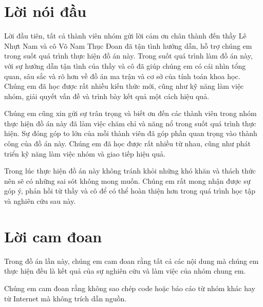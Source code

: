 \documentclass[a4paper]{article}
\renewcommand{\figurename}{Hình}
\begin{document}
\clearpage
\pagestyle{fancy}
\renewcommand{\contentsname}{Mục lục}
\renewcommand{\tablename}{Bảng}
\renewcommand{\figurename}{Hình}
\renewcommand{\refname}{Tài liệu tham khảo}

\tableofcontents
\thispagestyle{fancy}

\newpage

\renewcommand{\arraystretch}{1.3} %


\section*{Lời nói đầu}

Lời đầu tiên, tất cả thành viên nhóm gửi lời cảm ơn chân thành đến thầy Lê Nhựt Nam và cô Võ Nam Thục Đoan đã tận tình hướng dẫn, hỗ trợ chúng em trong suốt quá trình thực hiện đồ án này. Trong suốt quá trình làm đồ án này, với sự hướng dẫn tận tình của thầy và cô đã giúp chúng em có cái nhìn tổng quan, sâu sắc và rõ hơn về đồ án ma trận và cơ sở của tính toán khoa học. Chúng em đã học được rất nhiều kiến thức mới, cũng như kỹ năng làm việc nhóm, giải quyết vấn đề và trình bày kết quả một cách hiệu quả.

Chúng em cũng xin gửi sự trân trọng và biết ơn đến các thành viên trong nhóm thực hiện đồ án này đã làm việc chăm chỉ và năng nổ trong suốt quá trình thực hiện. Sự đóng góp to lớn của mỗi thành viên đã góp phần quan trọng vào thành công của đồ án này. Chúng em đã học được rất nhiều từ nhau, cũng như phát triển kỹ năng làm việc nhóm và giao tiếp hiệu quả.    

Trong lúc thực hiện đồ án này không tránh khỏi những khó khăn và thách thức nên sẽ có những sai sót không mong muốn. Chúng em rất mong nhận được sự góp ý, phản hồi từ thầy và cô để có thể hoàn thiện hơn trong quá trình học tập và nghiên cứu sau này.

\section*{Lời cam đoan}

Trong đồ án lần này, chúng em cam đoan rằng tất cả các nội dung mà chúng em thực hiện đều là kết quả của sự nghiên cứu và làm việc của nhóm chung em. 

Chúng em cam đoan rằng không sao chép code hoặc báo cáo từ nhóm khác hay từ Internet mà không
trích dẫn nguồn. 
\end{document}
